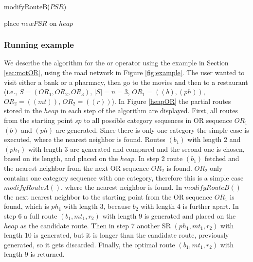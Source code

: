\enlargethispage{\baselineskip}

\begin{procedure}[H]
\caption{modifyRouteB($PSR$)}
\label{proc:modifyRouteB}
	
	
	
	place $newPSR$ on $heap$\;
\end{procedure}

\subsubsection{Running example}
We describe the algorithm for the or operator using the example in Section \ref{sec:motOR}, using the road network in Figure \ref{fig:example}. The user wanted to visit either a bank or a pharmacy, then go to the movies and then to a restaurant (i.e., $S = (OR_1, OR_2, OR_3)$, $|S| = n = 3$, $OR_1 = ((b), (ph))$, $OR_2 = ((mt))$, $OR_2 = ((r))$). In Figure \ref{heapOR} the partial routes stored in the $heap$ in each step of the algorithm are displayed.
First, all routes from the starting point $sp$ to all possible category sequences in OR sequence $OR_1$ $(b)$ and $(ph)$ are generated. Since there is only one category the simple case is executed, where the nearest neighbor is found. Routes $(b_1)$ with length 2 and $(ph_1)$ with length 3 are generated and compared and the second one is chosen, based on its length, and placed on the $heap$. In step 2 route $(b_1)$ fetched and the nearest neighbor from the next OR sequence $OR_2$ is found. $OR_2$ only contains one category sequence with one category, therefore this is a simple case $modifyRouteA()$, where the nearest neighbor is found. In $modifyRouteB()$ the next nearest neighbor to the starting point from the OR sequence $OR_1$ is found, which is $ph_1$ with length 3, because $b_2$ with length 4 is further apart. 
In step 6 a full route $(b_1, mt_1, r_2)$ with length 9 is generated and placed on the $heap$ as the candidate route. Then in step 7 another SR $(ph_1, mt_1, r_2)$ with length 10 is generated, but it is longer than the candidate route, previously generated, so it gets discarded. Finally, the optimal route $(b_1, mt_1, r_2)$ with length 9 is returned.

